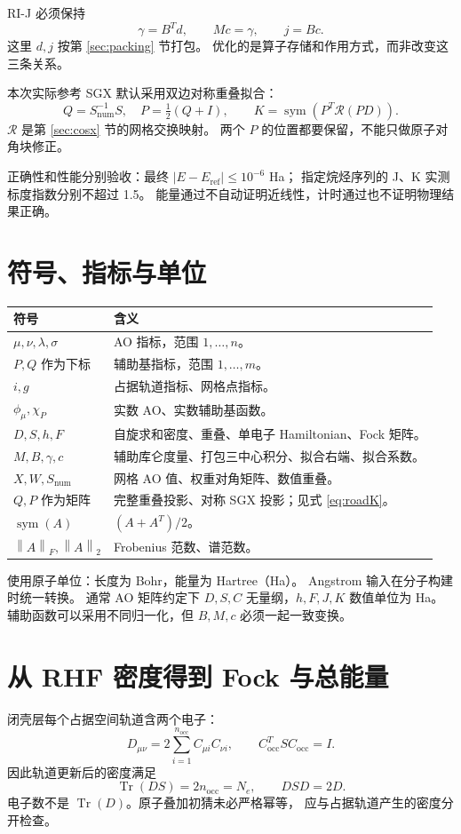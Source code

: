 \documentclass[UTF8,fontset=fandol,11pt,a4paper]{ctexart}
\numberwithin{equation}{section}
\newcommand{\Tr}{\operatorname{Tr}}
\newcommand{\sym}{\operatorname{sym}}
\newcommand{\norm}[1]{\left\lVert #1\right\rVert}
\begin{document}
RI-J 必须保持
\begin{equation}
\boxed{\gamma=B^Td,\qquad Mc=\gamma,\qquad j=Bc.}
\label{eq:roadJ}
\end{equation}
这里 \(d,j\) 按第 \ref{sec:packing} 节打包。
优化的是算子存储和作用方式，而非改变这三条关系。

本次实际参考 SGX 默认采用双边对称重叠拟合：
\begin{equation}
Q=S_{\mathrm{num}}^{-1}S,\quad P=\tfrac12(Q+I),\qquad
\boxed{K=\sym\!\left(P^T\mathcal R(PD)\right).}
\label{eq:roadK}
\end{equation}
\(\mathcal R\) 是第 \ref{sec:cosx} 节的网格交换映射。
两个 \(P\) 的位置都要保留，不能只做原子对角块修正。

正确性和性能分别验收：最终
\(|E-E_{\mathrm{ref}}|\leq10^{-6}\) Ha；
指定烷烃序列的 J、K 实测标度指数分别不超过 1.5。
能量通过不自动证明近线性，计时通过也不证明物理结果正确。

\section{符号、指标与单位}
\begin{longtable}{p{}p{}}
\toprule 符号&含义\\\midrule\endhead
\(\mu,\nu,\lambda,\sigma\)&AO 指标，范围 \(1,\ldots,n\)。\\
\(P,Q\) 作为下标&辅助基指标，范围 \(1,\ldots,m\)。\\
\(i,g\)&占据轨道指标、网格点指标。\\
\(\phi_\mu,\chi_P\)&实数 AO、实数辅助基函数。\\
\(D,S,h,F\)&自旋求和密度、重叠、单电子 Hamiltonian、Fock 矩阵。\\
\(M,B,\gamma,c\)&辅助库仑度量、打包三中心积分、拟合右端、拟合系数。\\
\(X,W,S_{\mathrm{num}}\)&网格 AO 值、权重对角矩阵、数值重叠。\\
\(Q,P\) 作为矩阵&完整重叠投影、对称 SGX 投影；见式 \eqref{eq:roadK}。\\
\(\sym(A)\)&\((A+A^T)/2\)。\\
\(\norm{A}_F,\norm{A}_2\)&Frobenius 范数、谱范数。\\
\bottomrule
\end{longtable}
使用原子单位：长度为 Bohr，能量为 Hartree（Ha）。
Angstrom 输入在分子构建时统一转换。
通常 AO 矩阵约定下 \(D,S,C\) 无量纲，\(h,F,J,K\) 数值单位为 Ha。
辅助函数可以采用不同归一化，但 \(B,M,c\) 必须一起一致变换。

\section{从 RHF 密度得到 Fock 与总能量}
闭壳层每个占据空间轨道含两个电子：
\begin{equation}
D_{\mu\nu}=2\sum_{i=1}^{n_{\mathrm{occ}}}C_{\mu i}C_{\nu i},
\qquad C_{\mathrm{occ}}^TSC_{\mathrm{occ}}=I.
\end{equation}
因此轨道更新后的密度满足
\begin{equation}
\Tr(DS)=2n_{\mathrm{occ}}=N_e,\qquad DSD=2D.
\label{eq:count}
\end{equation}
电子数不是 \(\Tr(D)\)。原子叠加初猜未必严格幂等，
应与占据轨道产生的密度分开检查。
\end{document}
